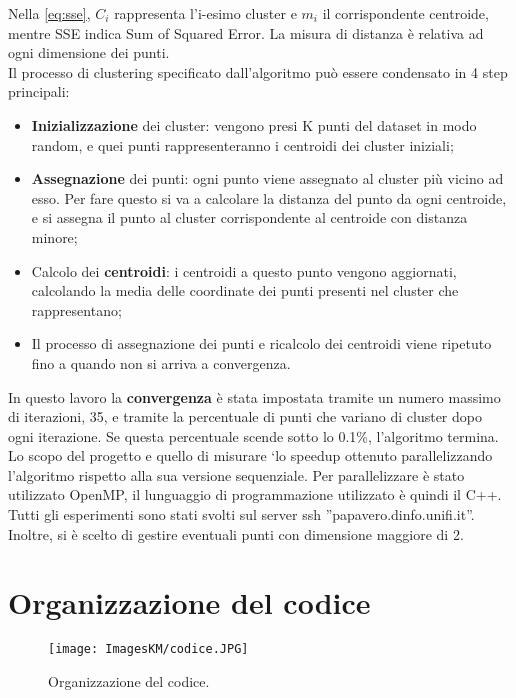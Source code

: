 \documentclass[10pt,twocolumn,letterpaper]{article}
\newcommand{\bit} {\begin{itemize} }
\newcommand{\eit} {\end{itemize} }
\begin{document}
Nella \cref{eq:sse}, $C_i$ rappresenta l'i-esimo cluster e $m_i$ il corrispondente centroide, mentre SSE indica Sum of Squared Error. La misura di distanza è relativa ad ogni dimensione dei punti.\\
Il processo di clustering specificato dall'algoritmo può essere condensato in 4 step principali:

\bit
    \item{\textbf{Inizializzazione} dei cluster: vengono presi K punti del dataset in modo random, e quei punti rappresenteranno i centroidi dei cluster iniziali;}
    \item{\textbf{Assegnazione} dei punti: ogni punto viene assegnato al cluster più vicino ad esso. Per fare questo si va a calcolare la distanza del punto da ogni centroide, e si assegna il punto al cluster corrispondente al centroide con distanza minore;}
    \item{Calcolo dei \textbf{centroidi}: i centroidi a questo punto vengono aggiornati, calcolando la media delle coordinate dei punti presenti nel cluster che rappresentano;}
    \item{Il processo di assegnazione dei punti e ricalcolo dei centroidi viene ripetuto fino a quando non si arriva a convergenza.\\}
\eit

In questo lavoro la \textbf{convergenza} è stata impostata tramite un numero massimo di iterazioni, 35, e tramite la percentuale di punti che variano di cluster dopo ogni iterazione. Se questa percentuale scende sotto lo 0.1\%, l'algoritmo termina.\\
Lo scopo del progetto e quello di misurare `lo speedup ottenuto parallelizzando l’algoritmo rispetto alla sua versione sequenziale. Per parallelizzare è stato utilizzato OpenMP, il lunguaggio di programmazione utilizzato è quindi il C++.\\
Tutti gli esperimenti sono stati svolti sul server ssh ”papavero.dinfo.unifi.it”.\\
Inoltre, si è scelto di gestire eventuali punti con dimensione maggiore di 2.


\section{Organizzazione del codice}

\begin{figure}[h]
    \centering
    \texttt{[image: ImagesKM/codice.JPG]}
    \caption{Organizzazione del codice.}
\end{figure}
\end{document}
